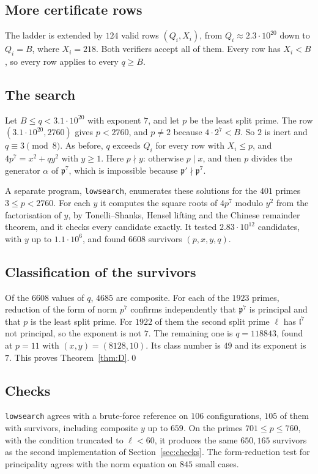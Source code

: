 \documentclass[11pt]{amsart}
\theoremstyle{remark}
\newcommand{\p}{\mathfrak{p}}
\begin{document}
\subsection*{More certificate rows}
The ladder is extended by $124$ valid rows $(Q_i,X_i)$, from $Q_i\approx2.3\cdot10^{20}$ down to $Q_i=B$, where $X_i=218$. Both verifiers accept all of them. Every row has $X_i<B$, so every row applies to every $q\ge B$.

\subsection*{The search}
Let $B\le q<3.1\cdot10^{20}$ with exponent $7$, and let $p$ be the least split prime. The row $(3.1\cdot10^{20},2760)$ gives $p<2760$, and $p\ne2$ because $4\cdot2^7<B$. So $2$ is inert and $q\equiv3\pmod8$. As before, $q$ exceeds $Q_i$ for every row with $X_i\le p$, and $4p^7=x^2+qy^2$ with $y\ge1$. Here $p\nmid y$: otherwise $p\mid x$, and then $p$ divides the generator $\alpha$ of $\p^7$, which is impossible because $\p'\nmid\p^7$.

A separate program, \texttt{lowsearch}, enumerates these solutions for the $401$ primes $3\le p<2760$. For each $y$ it computes the square roots of $4p^7$ modulo $y^2$ from the factorisation of $y$, by Tonelli--Shanks, Hensel lifting and the Chinese remainder theorem, and it checks every candidate exactly. It tested $2.83\cdot10^{12}$ candidates, with $y$ up to $1.1\cdot10^6$, and found $6608$ survivors $(p,x,y,q)$.

\subsection*{Classification of the survivors}
Of the $6608$ values of $q$, $4685$ are composite. For each of the $1923$ primes, reduction of the form of norm $p^7$ confirms independently that $\p^7$ is principal and that $p$ is the least split prime. For $1922$ of them the second split prime $\ell$ has $\mathfrak l^7$ not principal, so the exponent is not $7$. The remaining one is $q=118843$, found at $p=11$ with $(x,y)=(8128,10)$. Its class number is $49$ and its exponent is $7$. This proves Theorem~\ref{thm:D}.\qed

\subsection*{Checks}
\texttt{lowsearch} agrees with a brute-force reference on $106$ configurations, $105$ of them with survivors, including composite $y$ up to $659$. On the primes $701\le p\le760$, with the condition truncated to $\ell<60$, it produces the same $650{,}165$ survivors as the second implementation of Section~\ref{sec:checks}. The form-reduction test for principality agrees with the norm equation on $845$ small cases.
\end{document}
